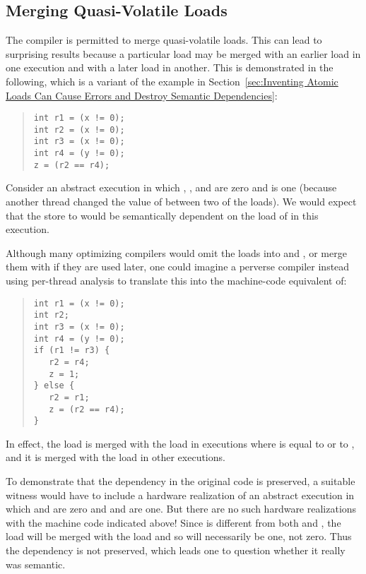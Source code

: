 \subsection{Merging Quasi-Volatile Loads}
\label{sec:Merging Quasi-Volatile Loads}

The compiler is permitted to merge quasi-volatile loads.
This can lead to surprising results because a particular load
may be merged with an earlier load in one execution and with a
later load in another.
This is demonstrated in the following, which is a variant of
the example in
Section~\ref{sec:Inventing Atomic Loads Can Cause Errors and
Destroy Semantic Dependencies}:
\begin{quote}
\begin{verbatim}
int r1 = (x != 0);
int r2 = (x != 0);
int r3 = (x != 0);
int r4 = (y != 0);
z = (r2 == r4);
\end{verbatim}
\end{quote}
Consider an abstract execution in which , , and 
are zero and  is one (because another thread changed the value
of  between two of the loads).
We would expect that the store to  would be semantically
dependent on the load of  in this execution.

Although many optimizing compilers would omit the loads into 
and , or merge them with  if they are used later, one
could imagine a perverse compiler instead using per-thread analysis to
translate this into the machine-code equivalent of:
\begin{quote}
\begin{verbatim}
int r1 = (x != 0);
int r2;
int r3 = (x != 0);
int r4 = (y != 0);
if (r1 != r3) {
   r2 = r4;
   z = 1;
} else {
   r2 = r1;
   z = (r2 == r4);
}
\end{verbatim}
\end{quote}
In effect, the  load is merged with the  load in
executions where  is equal to  or to , and it is
merged with the  load in other executions.

To demonstrate that the dependency in the original code is preserved,
a suitable witness would have
to include a hardware realization of an abstract execution in which
 and  are zero and  and  are one.
But there are no such hardware realizations with the
machine code indicated above!
Since  is different from both  and , the 
load will be merged with the  load and so  will
necessarily be one, not zero.
Thus the dependency is not preserved, which leads one to question
whether it really was semantic.

